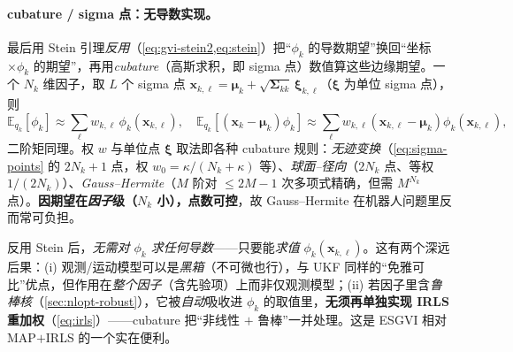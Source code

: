 \paragraph{cubature / sigma 点：无导数实现。}
最后用 Stein 引理\emph{反用}（\cref{eq:gvi-stein2,eq:stein}）把“$\phi_k$ 的导数期望”换回“坐标$\times\phi_k$ 的期望”，再用\emph{cubature}（高斯求积，即 sigma 点）数值算这些边缘期望。一个 $N_k$ 维因子，取 $L$ 个 sigma 点 $\mathbf{x}_{k,\ell}=\boldsymbol{\mu}_k+\sqrt{\boldsymbol{\Sigma}_{kk}}\,\boldsymbol{\xi}_{k,\ell}$（$\boldsymbol{\xi}$ 为单位 sigma 点），则
\begin{equation}
  \mathbb{E}_{q_k}[\phi_k]\approx\sum_{\ell}w_{k,\ell}\,\phi_k(\mathbf{x}_{k,\ell}),\quad
  \mathbb{E}_{q_k}[(\mathbf{x}_k-\boldsymbol{\mu}_k)\phi_k]\approx\sum_{\ell}w_{k,\ell}(\mathbf{x}_{k,\ell}-\boldsymbol{\mu}_k)\phi_k(\mathbf{x}_{k,\ell}),
  \label{eq:gvi-cubature}
\end{equation}
二阶矩同理。权 $w$ 与单位点 $\boldsymbol{\xi}$ 取法即各种 cubature 规则：\emph{无迹变换}（\cref{eq:sigma-points} 的 $2N_k+1$ 点，权 $w_0=\kappa/(N_k+\kappa)$ 等）、\emph{球面--径向}（$2N_k$ 点、等权 $1/(2N_k)$）、\emph{Gauss--Hermite}（$M$ 阶对 $\le2M-1$ 次多项式精确，但需 $M^{N_k}$ 点）。\textbf{因期望在\emph{因子}级（$N_k$ 小），点数可控}，故 Gauss--Hermite 在机器人问题里反而常可负担。

\begin{insight}
反用 Stein 后，\emph{无需对 $\phi_k$ 求任何导数}——只要能\emph{求值} $\phi_k(\mathbf{x}_{k,\ell})$。这有两个深远后果：(i) 观测/运动模型可以是\emph{黑箱}（不可微也行），与 UKF 同样的“免雅可比”优点，但作用在\emph{整个因子}（含先验项）上而非仅观测模型；(ii) 若因子里含\emph{鲁棒核}（\cref{sec:nlopt-robust}），它被\emph{自动}吸收进 $\phi_k$ 的取值里，\textbf{无须再单独实现 IRLS 重加权}（\cref{eq:irls}）——cubature 把“非线性 $+$ 鲁棒”一并处理。这是 ESGVI 相对 MAP$+$IRLS 的一个实在便利。
\end{insight}

